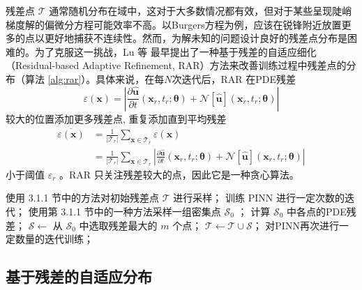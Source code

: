 残差点 $\mathcal{T} $ 通常随机分布在域中，这对于大多数情况都有效，但对于某些呈现陡峭梯度解的偏微分方程可能效率不高。以Burgers方程为例，应该在锐锋附近放置更多的点以更好地捕获不连续性。然而，为解未知的问题设计良好的残差点分布是困难的。为了克服这一挑战，Lu 等 \cite{lu2021deepxde}最早提出了一种基于残差的自适应细化（Residual-based Adaptive Refinement, RAR）方法来改善训练过程中残差点的分布（算法 \ref{alg:rar}）。具体来说，在每$N$次迭代后，RAR 在PDE残差
\begin{equation}
    \label{equ:pde_absolute}
    \varepsilon(\mathbf{x})=|\frac{\partial \boldsymbol{\hat{u}}}{\partial t}(\boldsymbol{x}_r,t_r;\boldsymbol{\theta})+\mathcal{N}[\boldsymbol{\hat{u}}](\boldsymbol{x}_r,t_r;\boldsymbol{\theta})|
\end{equation}
较大的位置添加更多残差点, 重复添加直到平均残差
\begin{equation}
    \label{equ:pde_average}
    \begin{aligned}
        \overline{\varepsilon(\mathbf{x})}
        & =\frac1{|\mathcal{T}_r|}\sum_{\boldsymbol{x}\in \mathcal{T}_r}\varepsilon(\mathbf{x}) \\
        & =\frac1{|\mathcal{T}_r|}\sum_{\boldsymbol{x}\in \mathcal{T}_r}|\frac{\partial \boldsymbol{\hat{u}}}{\partial t}(\boldsymbol{x}_r,t_r;\boldsymbol{\theta})+\mathcal{N}[\boldsymbol{\hat{u}}](\boldsymbol{x}_r,t_r;\boldsymbol{\theta})|
    \end{aligned}
\end{equation}
小于阈值 $\varepsilon _r$ 。RAR 只关注残差较大的点，因此它是一种贪心算法。

\begin{algorithm}[h]
    \caption{基于残差的自适应细化（RAR）}
    \label{alg:rar}
    \begin{algorithmic}[1]
        \STATE 使用 3.1.1 节中的方法对初始残差点 $\mathcal{T}$ 进行采样；
        \STATE 训练 PINN 进行一定次数的迭代；
            \STATE 使用第 3.1.1 节中的一种方法采样一组密集点 $\mathcal{S}_0$ ；
            \STATE 计算 $\mathcal{S}_0$ 中各点的PDE残差；
            \STATE $\mathcal{S} \leftarrow$ 从 $\mathcal{S}_0$ 中选取残差最大的 $m$ 个点；
            \STATE $\mathcal{T} \leftarrow \mathcal{T} \cup \mathcal{S}$； %
            \STATE 对PINN再次进行一定数量的迭代训练；
        \ENDFOR %
    \end{algorithmic}
\end{algorithm}

\subsection{基于残差的自适应分布}

